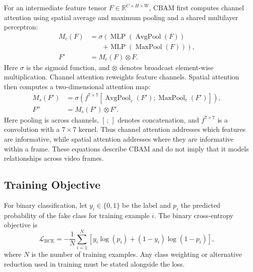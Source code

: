 For an intermediate feature tensor $F\in\mathbb{R}^{C\times H\times W}$, CBAM first computes channel attention using spatial average and maximum pooling and a shared multilayer perceptron:
\begin{equation}
    \begin{aligned}
        M_c(F)&=\sigma\!\left(\operatorname{MLP}(\operatorname{AvgPool}(F))\right.\\
        &\qquad\left.+\operatorname{MLP}(\operatorname{MaxPool}(F))\right),\\
        F'&=M_c(F)\otimes F.
    \end{aligned}
    \label{eq:channel-attention}
\end{equation}
Here $\sigma$ is the sigmoid function, and $\otimes$ denotes broadcast element-wise multiplication. Channel attention reweights feature channels. Spatial attention then computes a two-dimensional attention map:
\begin{equation}
    \begin{aligned}
        M_s(F')&=\sigma\!\left(f^{7\times7}
        [\operatorname{AvgPool}_c(F');\operatorname{MaxPool}_c(F')]\right),\\
        F''&=M_s(F')\otimes F'.
    \end{aligned}
    \label{eq:spatial-attention}
\end{equation}
Here pooling is across channels, $[\,;\,]$ denotes concatenation, and $f^{7\times7}$ is a convolution with a $7\times7$ kernel. Thus channel attention addresses which features are informative, while spatial attention addresses where they are informative within a frame. These equations describe CBAM and do not imply that it models relationships across video frames.

\subsection{Training Objective}
For binary classification, let $y_i\in\{0,1\}$ be the label and $p_i$ the predicted probability of the fake class for training example $i$. The binary cross-entropy objective is
\begin{equation}
    \mathcal{L}_{\mathrm{BCE}}=-\frac{1}{N}\sum_{i=1}^{N}
    \left[y_i\log(p_i)+(1-y_i)\log(1-p_i)\right],
    \label{eq:bce}
\end{equation}
where $N$ is the number of training examples. Any class weighting or alternative reduction used in training must be stated alongside the loss.

